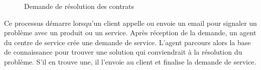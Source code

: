 \begin{figure}[H]
    \label{fig-gestion-contrats-client}
    \noindent{}
    \caption{Demande de résolution des contrats}
\end{figure}

Ce processus démarre lorsqu’un client appelle ou envoie un email pour signaler un problème avec un produit ou un service. Après réception de la demande, un agent du centre de service crée une demande de service. L’agent parcours alors la base de connaissance pour trouver une solution qui conviendrait à la résolution du problème. S’il en trouve une, il l’envoie au client et finalise la demande de service.
